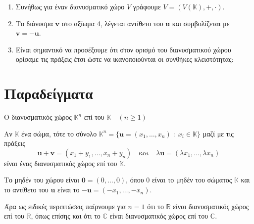 \begin{rem}
\item {}
  \begin{enumerate}
    \item Συνήθως για έναν διανυσματικό χώρο $V$ γράφουμε 
      $V = (V(\mathbb{K}), +, \cdot) $.
    \item Το διάνυσμα $ \mathbf{v} $ στο αξίωμα 4, λέγεται 
      \textcolor{Col2}{αντίθετο} του $ \mathbf{u} $ και συμβολίζεται με 
      $ \mathbf{v} = - \mathbf{u} $.
    \item Είναι σημαντικό να προσέξουμε ότι στον ορισμό του διανυσματικού χώρου 
      ορίσαμε τις πράξεις έτσι ώστε να ικανοποιούνται οι συνθήκες κλειστότητας:
  \end{enumerate}
\end{rem}


\section{Παραδείγματα}


\begin{example}\label{ex:Rn}
  \textcolor{Col2}{Ο διανυσματικός χώρος $ \mathbb{K}^{n} $ 
  επί του $ \mathbb{K} \quad (n \geq 1) $}

  Αν $ \mathbb{K} $ ένα σώμα, τότε το σύνολο $ \mathbb{K}^{n} = 
  \{ \mathbf{u} = (x_{1},\ldots,x_{n}) \; : \; x_{i} \in \mathbb{K}\} $ 
  μαζί με τις πράξεις 
  \[
    \mathbf{u}+ \mathbf{v} = (x_{1}+ y_{1}, \ldots , x_{n}+y_{n}) 
    \quad \text{και} \quad \lambda \mathbf{u} = 
    ( \lambda x_{1}, \ldots, \lambda x_{n})
  \]
  είναι ένας διανυσματικός χώρος επί του $ \mathbb{K} $. 

  Το μηδέν του χώρου 
  είναι $ \mathbf{0} = (0,\ldots,0) $, όπου $0$ είναι το μηδέν του σώματος 
  $ \mathbb{K} $ και το αντίθετο του $ \mathbf{u} $ είναι το $ - \mathbf{u} =
  (- x_{1}, \ldots, - x_{n}) $.

  Άρα ως ειδικές περιπτώσεις παίρνουμε για $ n=1 $ ότι το $ \mathbb{R} $ 
  είναι διανυσματικός χώρος επί του $ \mathbb{R} $, όπως επίσης και ότι το 
  $ \mathbb{C} $ είναι διανυσματικός χώρος επί του $ \mathbb{C} $.
\end{example} 

